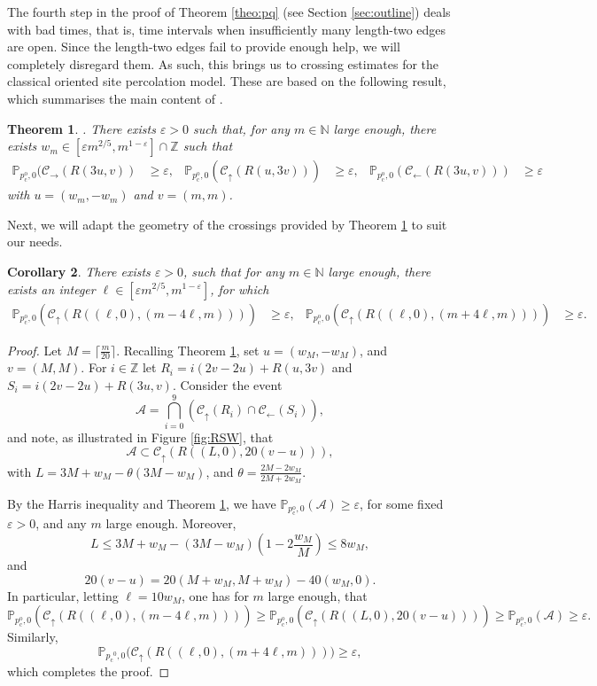 \documentclass[pdflatex,sn-mathphys-num]{sn-jnl}%
\newcommand{\cA}{\ensuremath{\mathcal A}}
\newcommand{\cC}{\ensuremath{\mathcal C}}
\newcommand{\bbN}{{\ensuremath{\mathbb N}} }
\newcommand{\bbP}{{\ensuremath{\mathbb P}} }
\newcommand{\bbZ}{{\ensuremath{\mathbb Z}} }
\newcommand{\1}{{\ensuremath{\mathbf{1}}} }
\newcommand{\pc}{\ensuremath{p_{\mathrm{c}} }}
\newcommand{\pco}{\ensuremath{p_{\mathrm{c}}^{\mathrm{o}} }}
\theoremstyle{thmstyleone}%
\newtheorem{theorem}{Theorem}%
\newtheorem{corollary}[theorem]{Corollary}%
\theoremstyle{thmstyletwo}%
\theoremstyle{thmstylethree}%
\begin{document}
The fourth step in the proof of Theorem \ref{theo:pq} (see Section \ref{sec:outline}) deals with bad times, that is, time intervals when insufficiently many length-two edges are open. Since the length-two edges fail to provide enough help, we 
will completely disregard them. 
As such, this brings us to crossing estimates for the classical oriented site percolation model. These are based on the following result,  which summarises the main content of \cite{Duminil-Copin17}.
\begin{theorem}\cite[Theorem~1.3, Proposition~4.2, Remark~4.4]{Duminil-Copin17}.
\label{th:DCTT}
There exists $\varepsilon>0$ such that, for any $m\in\bbN$ large enough, there exists $w_m\in[\varepsilon m^{2/5},m^{1-\varepsilon}]\cap\bbZ$ such that
\begin{align*}\bbP_{\pco,0}(\cC_\rightarrow(R(3u,v))&\ge \varepsilon,&
\bbP_{\pco,0}(\cC_\uparrow(R(u,3v)))&\ge\varepsilon,&\bbP_{\pco,0}(\cC_\leftarrow(R(3u,v)))&\ge \varepsilon
\end{align*}
with $u=(w_m,-w_m)$ and $v=(m,m)$.
\end{theorem}

Next, we will adapt the geometry of the crossings provided by Theorem \ref{th:DCTT} to suit our needs.

\begin{corollary}
\label{cor:renorm:bad}
There exists $\varepsilon>0$, such that for any $m\in \bbN$ large enough, there exists an integer $\ell \in [\varepsilon m^{2/5},m^{1-\varepsilon}]$, for which 
\begin{align*}
\bbP_{\pco,0}\left(\cC_\uparrow(R((\ell,0),(m-4 \ell ,m)))\right)&{}\ge \varepsilon,&\bbP_{\pco,0}\left(\cC_\uparrow(R((\ell,0),(m+4 \ell ,m)))\right)&{}\ge \varepsilon.
\end{align*}
\end{corollary}
\begin{proof}
Let $M=\lceil  \tfrac{m}{20}\rceil$. Recalling Theorem \ref{th:DCTT}, set $u=(w_M,-w_M)$, and $v=(M,M)$. For $i\in\bbZ$ let $R_i=i(2v-2u)+R(u,3v)$ and $S_i=i(2v-2u)+R(3u,v)$. Consider the event 
\[\cA=\bigcap_{i=0}^{9}\left(\cC_\uparrow(R_i)\cap\cC_\leftarrow(S_i)\right),\]
and note, as illustrated in Figure \ref{fig:RSW}, 
that
\[\mathcal A\subset \cC_\uparrow(R((L,0),20(v-u))),\]
with $L = 3M+w_M -\theta (3M-w_M)$, and $\theta = \tfrac{2M-2w_M}{2M+2w_M}$. 

By the Harris inequality \cite{Harris60} and Theorem \ref{th:DCTT}, we have $\bbP_{\pco,0}(\cA)\ge \varepsilon$, for some fixed $\varepsilon>0$, and any $m$ large enough. 
Moreover, 
$$L \le 3M+w_M - (3M-w_M)\left(1-2\frac{w_M}{M}\right) 
\le 8w_M, $$
and 
$$20(v-u) = 20 (M+w_M,M+w_M) - 40 (w_M,0).$$ 
In particular, letting $\ell = 10w_M$, one has for $m$ large enough, that 
$$
\bbP_{\pco,0}(\cC_\uparrow( 
R((\ell,0),(m-4\ell,m))))\ge \bbP_{\pco,0}(\cC_\uparrow(R((L,0),20(v-u))))\ge\bbP_{\pco,0}(\cA) \ge \varepsilon.
$$ 
Similarly,
$$\mathbb P_{\pc^0,0}\big( \mathcal C_\uparrow(R((\ell,0),(m+4\ell,m)))\big) \ge \varepsilon,$$
which completes the proof.  
\end{proof}
\end{document}
